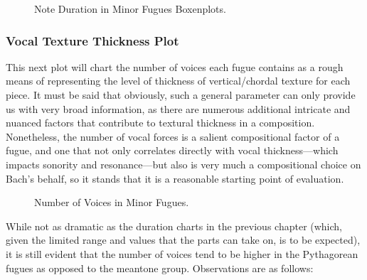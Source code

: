 \begin{figure}[H]
    \begin{center}
    \caption{Note Duration in Minor Fugues Boxenplots.}
    \end{center}
\end{figure}
    
    \subsubsection{Vocal Texture Thickness
Plot}\label{vocal-texture-thickness-plot}

This next plot will chart the number of voices each fugue contains as a
rough means of representing the level of thickness of vertical/chordal
texture for each piece. It must be said that obviously, such a general
parameter can only provide us with very broad information, as there are
numerous additional intricate and nuanced factors that contribute to
textural thickness in a composition. Nonetheless, the number of vocal
forces is a salient compositional factor of a fugue, and one that not
only correlates directly with vocal thickness---which impacts
sonority and resonance---but also is very much a compositional
choice on Bach's behalf, so it stands that it is a reasonable starting
point of evaluation.




\begin{figure}[H]
    \begin{center}
    \caption{Number of Voices in Minor Fugues.}
    \end{center}
\end{figure}
    
    While not as dramatic as the duration charts in the previous chapter
(which, given the limited range and values that the parts can take on,
is to be expected), it is still evident that the number of voices tend
to be higher in the Pythagorean fugues as opposed to the meantone group.
Observations are as follows:

